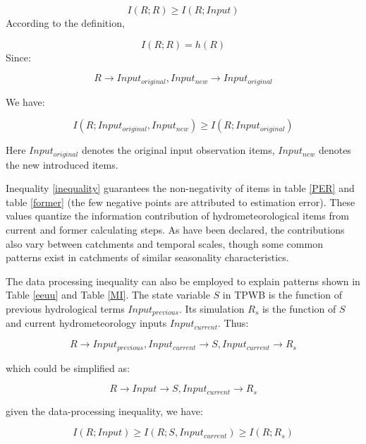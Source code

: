 \documentclass[draft,wrr]{AGUTeX}
\begin{document}
\begin{article}
\begin{equation}
\label{a}
I(R;R) \geq I(R;Input)
\end{equation}
According to the definition, 

\begin{equation}
\label{a}
I(R;R)=h(R)
\end{equation}
\fi
Since:

\begin{equation}
R \rightarrow Input_{original},Input_{new} \rightarrow Input_{original}
\end{equation} 

We have:

\begin{equation}
\label{inequality}
I(R;Input_{original},Input_{new}) \geq I(R;Input_{original})
\end{equation}

Here $Input_{original}$ denotes the original input observation items, $Input_{new}$ denotes the new introduced items.  

Inequality \ref{inequality} guarantees the non-negativity of items in table \ref{PER} and table \ref{former} (the few negative points are attributed to estimation error).  
These values quantize the information contribution of  hydrometeorological items from current and former calculating steps. As have been declared, the contributions also vary between catchments and temporal scales, though some common patterns exist in catchments of similar seasonality characteristics.

The data processing inequality can also be employed to explain patterns shown in Table \ref{eeuu} and Table \ref{MI}. The state variable $S$ in TPWB is the function of previous hydrological terms $Input_{previous}$. Its simulation $R_s$ is the function of $S$ and current hydrometeorology inputs $Input_{current}$. Thus:

\begin{equation}
R \rightarrow Input_{previous},Input_{current} \rightarrow S,Input_{current} \rightarrow R_s
\end{equation}

which could be simplified  as:

 \begin{equation}
R \rightarrow Input \rightarrow S,Input_{current} \rightarrow R_s
\end{equation}

given the data-processing inequality, we have:

\begin{equation}
\label{ie2}
I(R;Input)\geq I(R;S,Input_{current}) \geq I(R;R_s)
\end{equation}


\end{article}
\end{document}
